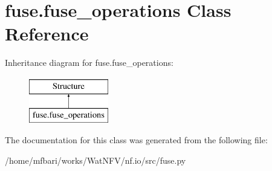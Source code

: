 \hypertarget{classfuse_1_1fuse__operations}{\section{fuse.\-fuse\-\_\-operations Class Reference}
\label{classfuse_1_1fuse__operations}
}
Inheritance diagram for fuse.\-fuse\-\_\-operations\-:\begin{figure}[H]
\begin{center}
\leavevmode
\includegraphics[height=2.000000cm]{classfuse_1_1fuse__operations}
\end{center}
\end{figure}


The documentation for this class was generated from the following file\-:\begin{DoxyCompactItemize}
\item 
/home/mfbari/works/\-Wat\-N\-F\-V/nf.\-io/src/fuse.\-py\end{DoxyCompactItemize}
